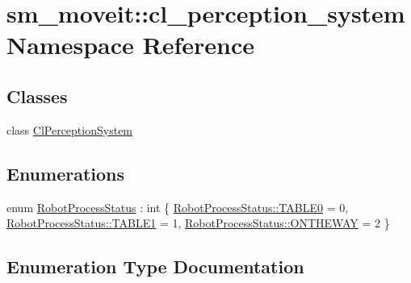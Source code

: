 \hypertarget{namespacesm__moveit_1_1cl__perception__system}{}\section{sm\+\_\+moveit\+:\+:cl\+\_\+perception\+\_\+system Namespace Reference}
\label{namespacesm__moveit_1_1cl__perception__system}
\subsection*{Classes}
\begin{DoxyCompactItemize}
\item 
class \hyperlink{classsm__moveit_1_1cl__perception__system_1_1ClPerceptionSystem}{Cl\+Perception\+System}
\end{DoxyCompactItemize}
\subsection*{Enumerations}
\begin{DoxyCompactItemize}
\item 
enum \hyperlink{namespacesm__moveit_1_1cl__perception__system_a730c3fd4da64d10a75ca4ab014fdbe40}{Robot\+Process\+Status} \+: int \{ \hyperlink{namespacesm__moveit_1_1cl__perception__system_a730c3fd4da64d10a75ca4ab014fdbe40a1fd65c0ced0ead229bf6dd6a59067a4f}{Robot\+Process\+Status\+::\+T\+A\+B\+L\+E0} = 0, 
\hyperlink{namespacesm__moveit_1_1cl__perception__system_a730c3fd4da64d10a75ca4ab014fdbe40a5b22e42e5d94a94037a4486a4976c49d}{Robot\+Process\+Status\+::\+T\+A\+B\+L\+E1} = 1, 
\hyperlink{namespacesm__moveit_1_1cl__perception__system_a730c3fd4da64d10a75ca4ab014fdbe40a92f7ea3097b3fdb1b7a25669cfc1b8bd}{Robot\+Process\+Status\+::\+O\+N\+T\+H\+E\+W\+AY} = 2
 \}
\end{DoxyCompactItemize}


\subsection{Enumeration Type Documentation}
